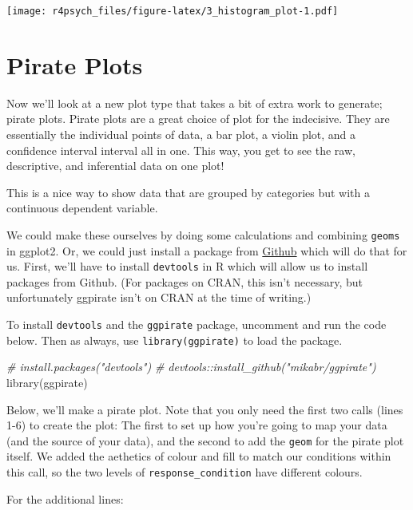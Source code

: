 \documentclass[
]{book}
\newenvironment{Shaded}{\begin{snugshade}}{\end{snugshade}}
\newcommand{\CommentTok}[1]{\textcolor[rgb]{0.56,0.35,0.01}{\textit{#1}}}
\newcommand{\FunctionTok}[1]{\textcolor[rgb]{0.00,0.00,0.00}{#1}}
\newcommand{\NormalTok}[1]{#1}
\begin{document}
\texttt{[image: r4psych\_files/figure-latex/3\_histogram\_plot-1.pdf]}

\hypertarget{pirate-plots}{%
\section{Pirate Plots}\label{pirate-plots}}

Now we'll look at a new plot type that takes a bit of extra work to generate; pirate plots. Pirate plots are a great choice of plot for the indecisive. They are essentially the individual points of data, a bar plot, a violin plot, and a confidence interval interval all in one. This way, you get to see the raw, descriptive, and inferential data on one plot!

This is a nice way to show data that are grouped by categories but with a continuous dependent variable.

We could make these ourselves by doing some calculations and combining \texttt{geoms} in ggplot2. Or, we could just install a package from \href{https://github.com/mikabr/ggpirate}{Github} which will do that for us. First, we'll have to install \texttt{devtools} in R which will allow us to install packages from Github. (For packages on CRAN, this isn't necessary, but unfortunately ggpirate isn't on CRAN at the time of writing.)

To install \texttt{devtools} and the \texttt{ggpirate} package, uncomment and run the code below. Then as always, use \texttt{library(ggpirate)} to load the package.

\begin{Shaded}
\begin{Highlighting}[]
\CommentTok{\# install.packages("devtools")}
\CommentTok{\# devtools::install\_github("mikabr/ggpirate")}
\FunctionTok{library}\NormalTok{(ggpirate)}
\end{Highlighting}
\end{Shaded}

Below, we'll make a pirate plot. Note that you only need the first two calls (lines 1-6) to create the plot: The first to set up how you're going to map your data (and the source of your data), and the second to add the \texttt{geom} for the pirate plot itself. We added the aethetics of colour and fill to match our conditions within this call, so the two levels of \texttt{response\_condition} have different colours.

For the additional lines:
\end{document}
